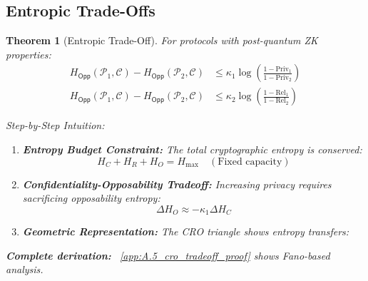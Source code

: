 \documentclass[preprint,12pt]{elsarticle}
\newtheorem{theorem}{Theorem}[section]
\begin{document}
        \subsection{Entropic Trade-Offs}
            \begin{theorem}[Entropic Trade-Off]\label{thm:cro_tradeoff}
                    For protocols with post-quantum ZK properties:
                    \begin{align}
                        H_{\mathsf{Opp}}(\mathcal{P}_1, \mathcal{C}) - H_{\mathsf{Opp}}(\mathcal{P}_2, \mathcal{C}) &\leq \kappa_1 \log\left(\frac{1 - \mathrm{Priv}_1}{1 - \mathrm{Priv}_2}\right) \label{eq:priv_tradeoff} \\
                        H_{\mathsf{Opp}}(\mathcal{P}_1, \mathcal{C}) - H_{\mathsf{Opp}}(\mathcal{P}_2, \mathcal{C}) &\leq \kappa_2 \log\left(\frac{1 - \mathrm{Rel}_1}{1 - \mathrm{Rel}_2}\right) \label{eq:rel_tradeoff}
                    \end{align}
                    
                    \textit{Step-by-Step Intuition:}
                    \begin{enumerate}
                        \item \textbf{Entropy Budget Constraint:} The total cryptographic entropy is conserved:
                    \[
                    H_C + H_R + H_O = H_{\max} \quad (\text{Fixed capacity})
                    \]
                    
                    \item \textbf{Confidentiality-Opposability Tradeoff:} Increasing privacy requires sacrificing opposability entropy:
                    \[
                    \Delta H_O \approx -\kappa_1 \Delta H_C
                    \]
                    
                    \item \textbf{Geometric Representation:} The CRO triangle shows entropy transfers:
                    \begin{center}
                    \end{center}
                \end{enumerate}
                \textbf{Complete derivation:} ~\ref{app:A.5_cro_tradeoff_proof} shows Fano-based analysis.
            \end{theorem}
\end{document}
